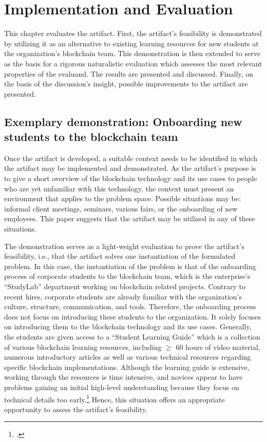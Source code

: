 \chapter{Implementation and Evaluation} \label{chap:Evaluation}

This chapter evaluates the artifact. First, the artifact's feasibility is demonstrated by utilizing it as an alternative to existing learning resources for new students at the organization's blockchain team. This demonstration is then extended to serve as the basis for a rigorous naturalistic evaluation which assesses the most relevant properties of the evaluand. The results are presented and discussed. Finally, on the basis of the discussion's insight, possible improvements to the artifact are presented.

\section{Exemplary demonstration: Onboarding new students to the blockchain team} \label{sec:demo}

Once the artifact is developed, a suitable context needs to be identified in which the artifact may be implemented and demonstrated. As the artifact's purpose is to give a short overview of the blockchain technology and its use cases to people who are yet unfamiliar with this technology, the context must present an environment that applies to the problem space. Possible situations may be: informal client meetings, seminars, various fairs, or the onboarding of new employees. This paper suggests that the artifact may be utilized in any of these situations.

The demonstration serves as a light-weight evaluation to prove the artifact's feasibility, i.e., that the artifact solves one instantiation of the formulated problem. In this case, the instantiation of the problem is that of the onboarding process of corporate students to the blockchain team, which is the enterprise's \enquote{StudyLab} department working on blockchain related projects. Contrary to recent hires, corporate students are already familiar with the organization's culture, structure, communication, and tools. Therefore, the onboarding process does not focus on introducing these students to the organization. It solely focuses on introducing them to the blockchain technology and its use cases. Generally, the students are given access to a \enquote{Student Learning Guide} which is a collection of various blockchain learning resources, including $\geq$ 60 hours of video material, numerous introductory articles as well as various technical resources regarding specific blockchain implementations. Although the learning guide is extensive, working through the resources is time intensive, and novices appear to have problems gaining an initial high-level understanding because they focus on technical details too early.\footcites[Cf.][]{RalphB_Interview} Hence, this situation offers an appropriate opportunity to assess the artifact's feasibility.

